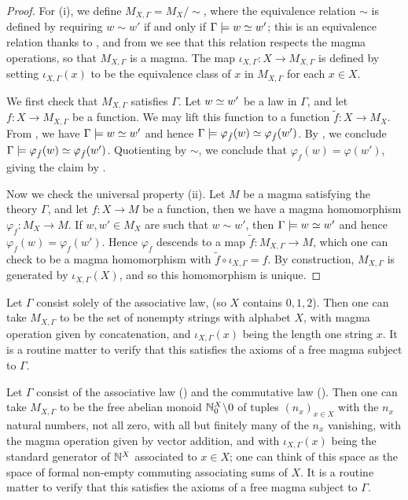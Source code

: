 \begin{proof}\leanok
  For (i), we define $M_{X,\Gamma} = M_X / \sim$, where the equivalence relation $\sim$ is defined by requiring $w \sim w'$ if and only if $\Gamma \models w \simeq w'$; this is an equivalence relation thanks to , and from  we see that this relation respects the magma operations, so that $M_{X,\Gamma}$ is a magma. The map $\iota_{X,\Gamma}: X \to M_{X,\Gamma}$ is defined by setting $\iota_{X,\Gamma}(x)$ to be the equivalence class of $x$ in $M_{X,\Gamma}$ for each $x \in X$.

  We first check that $M_{X,\Gamma}$ satisfies $\Gamma$. Let $w \simeq w'$ be a law in $\Gamma$, and let $f: X \to M_{X,\Gamma}$ be a function. We may lift this function to a function $\tilde{f}: X \to M_X$. From , we have $\Gamma \models w \simeq w'$ and hence $\Gamma \models \varphi_{\tilde{f}}(w) \simeq \varphi_{\tilde{f}}(w')$. By , we conclude $\Gamma \models \varphi_{\tilde{f}}(w) \simeq \varphi_{\tilde{f}}(w')$. Quotienting by $\sim$, we conclude that $\varphi_f(w) = \varphi(w')$, giving the claim by .

  Now we check the universal property (ii). Let $M$ be a magma satisfying the theory $\Gamma$, and let $f: X \to M$ be a function, then we have a magma homomorphism $\varphi_f: M_X \to M$. If $w, w' \in M_X$ are such that $w \sim w'$, then $\Gamma \models w \simeq w'$ and hence $\varphi_f(w) = \varphi_f(w')$. Hence $\varphi_f$ descends to a map $\tilde{f}: M_{X,\Gamma} \to M$, which one can check to be a magma homomorphism with $\tilde{f} \circ \iota_{X,\Gamma} = f$. By construction, $M_{X,\Gamma}$ is generated by $\iota_{X,\Gamma}(X)$, and so this homomorphism is unique.
\end{proof}

\begin{example}
  Let $\Gamma$ consist solely of the associative law,  (so $X$ contains $0,1,2$). Then one can take $M_{X,\Gamma}$ to be the set of nonempty strings with alphabet $X$, with magma operation given by concatenation, and $\iota_{X,\Gamma}(x)$ being the length one string $x$. It is a routine matter to verify that this satisfies the axioms of a free magma subject to $\Gamma$.
\end{example}

\begin{example}\label{facm}
  Let $\Gamma$ consist of the associative law () and the commutative law (). Then one can take $M_{X,\Gamma}$ to be the free abelian monoid $\mathbb{N}_0^X \backslash 0$ of tuples $(n_x)_{x \in X}$ with the $n_x$ natural numbers, not all zero, with all but finitely many of the $n_x$ vanishing, with the magma operation given by vector addition, and with $\iota_{X,\Gamma}(x)$ being the standard generator of $\mathbb{N}^X$ associated to $x \in X$; one can think of this space as the space of formal non-empty commuting associating sums of $X$. It is a routine matter to verify that this satisfies the axioms of a free magma subject to $\Gamma$.
\end{example}


